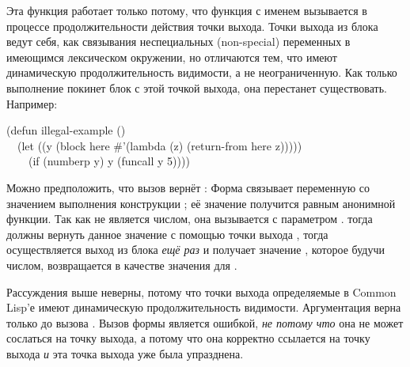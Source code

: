 Эта функция  работает только потому, что функция с именем
 вызывается в процессе продолжительности действия точки выхода.
Точки выхода из блока ведут себя, как связывания неспециальных (non-special)
переменных в имеющимся лексическом окружении, но отличаются тем, что имеют
динамическую продолжительность видимости, а не неограниченную. Как только
выполнение покинет блок с этой точкой выхода, она перестанет
существовать. Например: 

\begin{lisp}
(defun illegal-example () \\
~~(let ((y (block here \#'(lambda (z) (return-from here z))))) \\
~~~~(if (numberp y) y (funcall y 5))))
\end{lisp}

Можно предположить, что вызов  вернёт :
Форма  связывает переменную  со значением выполнения конструкции
; её значение получится равным анонимной функции. Так как  не
является числом, она вызывается с параметром .  тогда
должны вернуть данное значение с помощью точки выхода , тогда
осуществляется выход из блока \emph{ещё раз} и  получает значение ,
которое будучи числом, возвращается в качестве значения для .

Рассуждения выше неверны, потому что точки выхода определяемые в
Common Lisp'е имеют динамическую продолжительность видимости. Аргументация верна
только до вызова . Вызов формы  является
ошибкой, \emph{не потому что} она не может сослаться на точку выхода, а потому
что она корректно ссылается на точку выхода \emph{и} эта точка выхода уже была
упразднена.

\fi